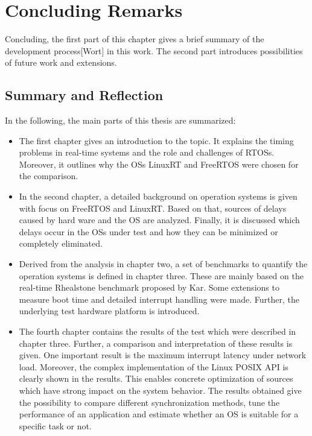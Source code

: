 \chapter{Concluding Remarks}\label{ch_conclusion}
Concluding, the first part of this chapter gives a brief summary of the development process[Wort] in this work.
The second part introduces possibilities of future work and extensions.

\section{Summary and Reflection}   
In the following, the main parts of this thesis are summarized:

\begin{itemize}
	\item 
	The first chapter gives an introduction to the topic. 
	It explains the timing problems in real-time systems and the role and challenges of \acp{RTOS}.
	Moreover, it outlines why the \acp{OS} LinuxRT and FreeRTOS were chosen for the comparison.
	\item
	In the second chapter, a detailed background on operation systems is given with focus on FreeRTOS and LinuxRT.
	Based on that, sources of delays caused by hard ware and the \ac{OS} are analyzed.
	Finally, it is discussed which delays occur in the \acp{OS} under test and how they can be minimized or completely eliminated.
	\item
	Derived from the analysis in chapter two, a set of benchmarks to quantify the operation systems is defined in chapter three.
	These are mainly based on the real-time Rhealstone benchmark proposed by Kar.
	Some extensions to measure boot time and detailed interrupt handling were made.
	Further, the underlying test hardware platform is introduced.
	\item
	The fourth chapter contains the results of the test which were described in chapter three.
	Further, a comparison and interpretation of these results is given.
	One important result is the maximum interrupt latency under network load.
	Moreover, the complex implementation of the Linux POSIX \ac{API} is clearly shown in the results.
	This enables concrete optimization of sources which have strong impact on the system behavior.	
	The results obtained give the possibility to compare different synchronization methods, tune the performance of an application and estimate whether an \ac{OS} is suitable for a specific task or not.
\end{itemize}

